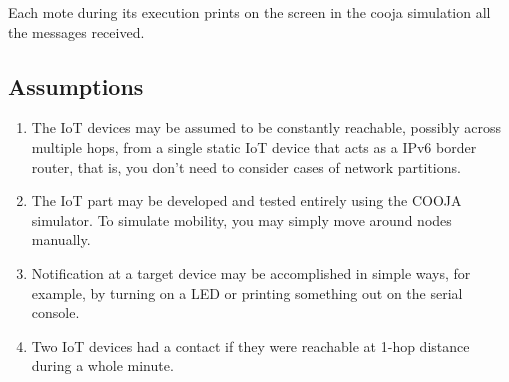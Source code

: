 \documentclass[table, 12pt]{article}
\begin{document}
Each mote during its execution prints on the screen in the cooja simulation all the messages received.

\subsection{Assumptions}
\begin{enumerate}[label=\textbf{A\arabic*:}]
    \item The IoT devices may be assumed to be constantly reachable, possibly across multiple hops, from a single static IoT device that acts as a IPv6 border router, that is, you don’t need to consider cases of network partitions.
    \item The IoT part may be developed and tested entirely using the COOJA simulator. To simulate mobility, you may simply move around nodes manually.
    \item Notification at a target device may be accomplished in simple ways, for example, by turning on a LED or printing something out on the serial console.
    \item Two IoT devices had a contact if they were reachable at 1-hop distance during a whole minute.
\end{enumerate}
\end{document}
